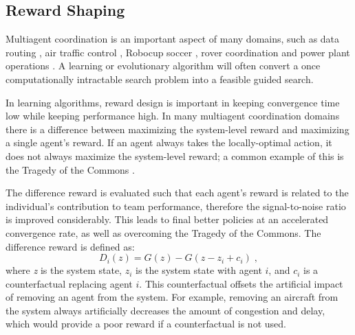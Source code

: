 \documentclass[letterpaper]{article}
\begin{document}



\subsection{Reward Shaping}
Multiagent coordination is an important aspect of many domains, such as data routing \cite{tumer-wolpert_jair02}, air traffic control \cite{tumer-agogino_jaamas12}, Robocup soccer \cite{AAMAS12-agmon}, rover coordination \cite{5509316} and power plant operations \cite{Colby:2012:SFF:2343576.2343637}. A learning or evolutionary algorithm will often convert a once computationally intractable search problem into a feasible guided search. 

In learning algorithms, reward design is important in keeping convergence time low while keeping performance high. In many multiagent coordination domains there is a difference between maximizing the system-level reward and maximizing a single agent's reward. If an agent always takes the locally-optimal action, it does not always maximize the system-level reward; a common example of this is the Tragedy of the Commons \cite{Hardin}.

The difference reward \cite{tumer-wolpert_jair02} is evaluated such that each agent's reward is related to the individual's contribution to team performance, therefore the signal-to-noise ratio is improved considerably. This leads to final better policies at an accelerated convergence rate, as well as overcoming the Tragedy of the Commons. The difference reward is defined as:
%
\begin{equation}
D_i(z) = G(z) - G(z - z_i + c_i)\;,
\end{equation}
%
where \textit{z} is the system state, $z_i$ is the system state with agent $i$, and $c_i$ is a counterfactual replacing agent $i$. This counterfactual offsets the artificial impact of removing an agent from the system. For example, removing an aircraft from the system always artificially decreases the amount of congestion and delay, which would provide a poor reward if a counterfactual is not used.
\end{document}
